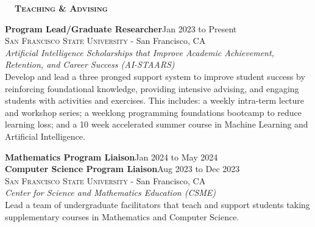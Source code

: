 \documentclass[hidelinks, 10.5pt]{article}
\def\contentwidth{0.9\linewidth}    %
\def\contentblockspacing{2.5mm}     %
\def\contentheaderspacing{1mm}      %
\def\sectionspacing{8mm}            %
\def\sectiontocontentspacing{4mm}   %
\renewcommand{\section}[1]{
    {\fontsize{14}{14}\selectfont \textsc{\textbf{\ \ #1\ \ }}}\hrulefill
}
\begin{document}
{\vspace{\sectionspacing}


\section{Teaching \& Advising}

\vspace{\sectiontocontentspacing}

\begin{minipage}[ct]{\contentwidth}
    \textbf{Program Lead/Graduate Researcher}\hfill Jan 2023 to Present\\
    {\textsc{San Francisco State University} - San Francisco, CA}\\
    \textit{Artificial Intelligence Scholarships that Improve Academic Achievement, Retention, and Career Success (AI-STAARS)}
    \vspace{\contentheaderspacing}\\
    Develop and lead a three pronged support system to improve student success by reinforcing foundational knowledge, providing intensive
    advising, and engaging students with activities and exercises. This includes: a weekly intra-term lecture and workshop series; a weeklong
    programming foundations bootcamp to reduce learning loss; and a 10 week accelerated summer course in Machine Learning and
    Artificial Intelligence.
\end{minipage}

\vspace{\contentblockspacing}

\begin{minipage}[ct]{\contentwidth}
    \textbf{Mathematics Program Liaison}\hfill Jan 2024 to May 2024\\
    \textbf{Computer Science Program Liaison}\hfill Aug 2023 to Dec 2023\\
    {\textsc{San Francisco State University} - San Francisco, CA}\\
    \textit{Center for Science and Mathematics Education (CSME)}
    \vspace{\contentheaderspacing}\\
    Lead a team of undergraduate facilitators that teach and support students taking supplementary courses in Mathematics and Computer
    Science.
\end{minipage}

}
\end{document}
